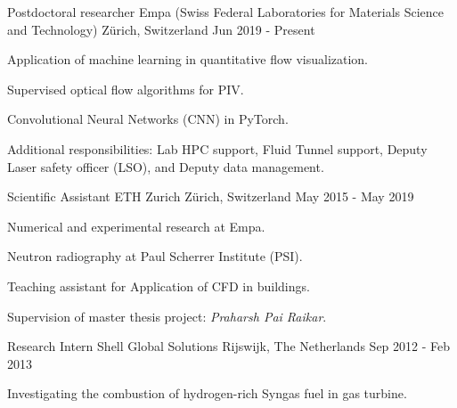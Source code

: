 \documentclass[11pt, a4paper]{preamble/awesome-cv-novo}
\begin{document}
\begin{cventries}

  \cventry
    {Postdoctoral researcher} %
    {Empa (Swiss Federal Laboratories for Materials Science and Technology)} %
    {Z\"urich, Switzerland} %
    {Jun 2019 - Present} %
    {
      \begin{cvitems} %
        \item {Application of machine learning in quantitative flow visualization.}
        \item {Supervised optical flow algorithms for PIV.}
        \item {Convolutional Neural Networks (CNN) in PyTorch.}
        \item {Additional responsibilities: Lab HPC support, Fluid Tunnel support, Deputy Laser safety officer (LSO), and Deputy data management.}
      \end{cvitems}
    }

  \cventry
    {Scientific Assistant}
    {ETH Zurich}
    {Z\"urich, Switzerland}
    {May 2015 - May 2019}
    {
      \begin{cvitems}
        \item {Numerical and experimental research at Empa.}
        \item {Neutron radiography at Paul Scherrer Institute (PSI).}
        \item {Teaching assistant for Application of CFD in buildings.}
        \item {Supervision of master thesis project: \textit{Praharsh Pai Raikar}.}
      \end{cvitems}
    }

    \cventry
    {Research Intern}
    {Shell Global Solutions}
    {Rijswijk, The Netherlands}
    {Sep 2012 - Feb 2013}
    {
      \begin{cvitems}
        \item {Investigating the combustion of hydrogen-rich Syngas fuel in gas turbine.}
      \end{cvitems}
    }

\end{cventries}



\end{document}
